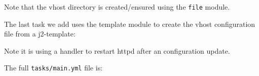 Note that the vhost directory is created/ensured using the \texttt{file}
module.

The last task we add uses the template module to create the vhost
configuration file from a j2-template:

\begin{Shaded}
\begin{Highlighting}[]
\KeywordTok{{-}}\AttributeTok{ }\KeywordTok{:}
\AttributeTok{  }\KeywordTok{:}
\AttributeTok{    }\KeywordTok{:}
\AttributeTok{    }\KeywordTok{:}
\AttributeTok{    }\KeywordTok{:}
\AttributeTok{    }\KeywordTok{:}
\AttributeTok{    }\KeywordTok{:}\AttributeTok{ }
\AttributeTok{  }\KeywordTok{:}
\AttributeTok{    }\KeywordTok{{-}}
\end{Highlighting}
\end{Shaded}

Note it is using a handler to restart httpd after an configuration
update.

The full \texttt{tasks/main.yml} file is:

